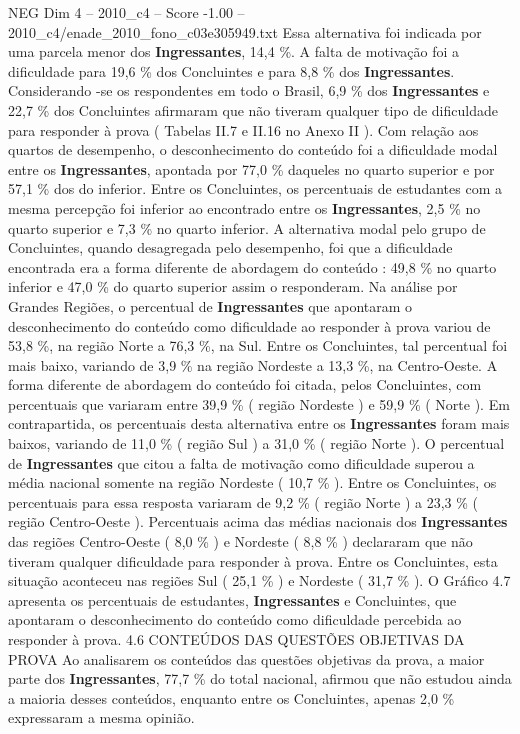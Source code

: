 \begin{textsample}{NEG Dim 4 – 2010\_c4 – Score -1.00 – 2010\_c4/enade\_2010\_fono\_c03e305949.txt}
Essa alternativa foi indicada por uma parcela menor dos \textbf{Ingressantes}, 14,4 \%.
A falta de motivação foi a dificuldade para 19,6 \% dos Concluintes e para 8,8 \% dos \textbf{Ingressantes}.
Considerando -se os respondentes em todo o Brasil, 6,9 \% dos \textbf{Ingressantes} e 22,7 \% dos Concluintes afirmaram que não tiveram qualquer tipo de dificuldade para responder à prova ( Tabelas II.7 e II.16 no Anexo II ).
Com relação aos quartos de desempenho, o desconhecimento do conteúdo foi a dificuldade modal entre os \textbf{Ingressantes}, apontada por 77,0 \% daqueles no quarto superior e por 57,1 \% dos do inferior.
Entre os Concluintes, os percentuais de estudantes com a mesma percepção foi inferior ao encontrado entre os \textbf{Ingressantes}, 2,5 \% no quarto superior e 7,3 \% no quarto inferior.
A alternativa modal pelo grupo de Concluintes, quando desagregada pelo desempenho, foi que a dificuldade encontrada era a forma diferente de abordagem do conteúdo : 49,8 \% no quarto inferior e 47,0 \% do quarto superior assim o responderam.
Na análise por Grandes Regiões, o percentual de \textbf{Ingressantes} que apontaram o desconhecimento do conteúdo como dificuldade ao responder à prova variou de 53,8 \%, na região Norte a 76,3 \%, na Sul.
Entre os Concluintes, tal percentual foi mais baixo, variando de 3,9 \% na região Nordeste a 13,3 \%, na Centro-Oeste.
A forma diferente de abordagem do conteúdo foi citada, pelos Concluintes, com percentuais que variaram entre 39,9 \% ( região Nordeste ) e 59,9 \% ( Norte ).
Em contrapartida, os percentuais desta alternativa entre os \textbf{Ingressantes} foram mais baixos, variando de 11,0 \% ( região Sul ) a 31,0 \% ( região Norte ).
O percentual de \textbf{Ingressantes} que citou a falta de motivação como dificuldade superou a média nacional somente na região Nordeste ( 10,7 \% ).
Entre os Concluintes, os percentuais para essa resposta variaram de 9,2 \% ( região Norte ) a 23,3 \% ( região Centro-Oeste ).
Percentuais acima das médias nacionais dos \textbf{Ingressantes} das regiões Centro-Oeste ( 8,0 \% ) e Nordeste ( 8,8 \% ) declararam que não tiveram qualquer dificuldade para responder à prova.
Entre os Concluintes, esta situação aconteceu nas regiões Sul ( 25,1 \% ) e Nordeste ( 31,7 \% ).
O Gráfico 4.7 apresenta os percentuais de estudantes, \textbf{Ingressantes} e Concluintes, que apontaram o desconhecimento do conteúdo como dificuldade percebida ao responder à prova. 4.6 CONTEÚDOS DAS QUESTÕES OBJETIVAS DA PROVA Ao analisarem os conteúdos das questões objetivas da prova, a maior parte dos \textbf{Ingressantes}, 77,7 \% do total nacional, afirmou que não estudou ainda a maioria desses conteúdos, enquanto entre os Concluintes, apenas 2,0 \% expressaram a mesma opinião.

\end{textsample}
